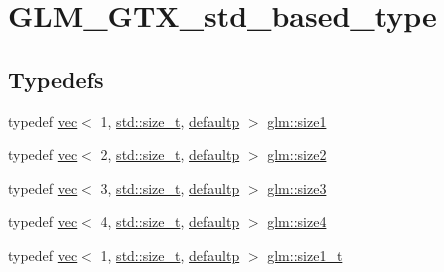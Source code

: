 \hypertarget{group__gtx__std__based__type}{}\section{G\+L\+M\+\_\+\+G\+T\+X\+\_\+std\+\_\+based\+\_\+type}
\label{group__gtx__std__based__type}
\subsection*{Typedefs}
\begin{DoxyCompactItemize}
\item 
typedef \hyperlink{structglm_1_1vec}{vec}$<$ 1, \hyperlink{_s_d_l__config__winrt_8h_a7c94ea6f8948649f8d181ae55911eeaf}{std\+::size\+\_\+t}, \hyperlink{namespaceglm_a36ed105b07c7746804d7fdc7cc90ff25a9d21ccd8b5a009ec7eb7677befc3bf51}{defaultp} $>$ \hyperlink{group__gtx__std__based__type_gaf471290b8165697d088a943263fc8af1}{glm\+::size1}
\item 
typedef \hyperlink{structglm_1_1vec}{vec}$<$ 2, \hyperlink{_s_d_l__config__winrt_8h_a7c94ea6f8948649f8d181ae55911eeaf}{std\+::size\+\_\+t}, \hyperlink{namespaceglm_a36ed105b07c7746804d7fdc7cc90ff25a9d21ccd8b5a009ec7eb7677befc3bf51}{defaultp} $>$ \hyperlink{group__gtx__std__based__type_ga432937b68775c79e4556150e769c6e6b}{glm\+::size2}
\item 
typedef \hyperlink{structglm_1_1vec}{vec}$<$ 3, \hyperlink{_s_d_l__config__winrt_8h_a7c94ea6f8948649f8d181ae55911eeaf}{std\+::size\+\_\+t}, \hyperlink{namespaceglm_a36ed105b07c7746804d7fdc7cc90ff25a9d21ccd8b5a009ec7eb7677befc3bf51}{defaultp} $>$ \hyperlink{group__gtx__std__based__type_ga2da33d9da32b31af75f036d948b54de5}{glm\+::size3}
\item 
typedef \hyperlink{structglm_1_1vec}{vec}$<$ 4, \hyperlink{_s_d_l__config__winrt_8h_a7c94ea6f8948649f8d181ae55911eeaf}{std\+::size\+\_\+t}, \hyperlink{namespaceglm_a36ed105b07c7746804d7fdc7cc90ff25a9d21ccd8b5a009ec7eb7677befc3bf51}{defaultp} $>$ \hyperlink{group__gtx__std__based__type_ga6051b5077b52ff8ea48a5207d5076aa5}{glm\+::size4}
\item 
typedef \hyperlink{structglm_1_1vec}{vec}$<$ 1, \hyperlink{_s_d_l__config__winrt_8h_a7c94ea6f8948649f8d181ae55911eeaf}{std\+::size\+\_\+t}, \hyperlink{namespaceglm_a36ed105b07c7746804d7fdc7cc90ff25a9d21ccd8b5a009ec7eb7677befc3bf51}{defaultp} $>$ \hyperlink{group__gtx__std__based__type_ga5bf40bbca3cb66bbd7cc0c389c3c0c56}{glm\+::size1\+\_\+t}
\item 

\end{DoxyCompactItemize}

